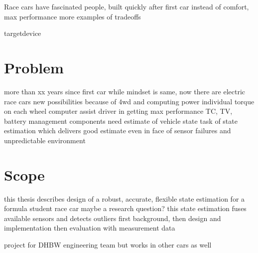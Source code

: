 Race cars have fascinated people, built quickly after first car
instead of comfort, max performance
more examples of tradeoffs

\gls{targetdevice}

\section{Problem}
more than xx years since first car
while mindset is same, now there are electric race cars
new possibilities because of \gls{4wd} and computing power
individual torque on each wheel
computer assist driver in getting max performance
TC, TV, battery management
components need estimate of vehicle state
task of state estimation which delivers good estimate even in face of sensor failures and unpredictable environment

\section{Scope}
this thesis describes design of a robust, accurate, flexible state estimation for a formula student race car
maybe a research question?
this state estimation fuses available sensors and detects outliers
first background, then design and implementation
then evaluation with measurement data

project for DHBW engineering team but works in other cars as well
